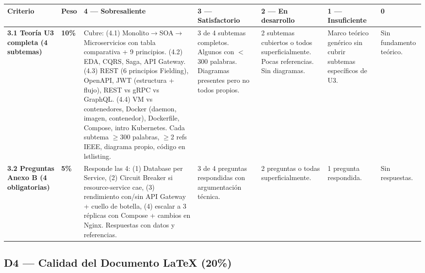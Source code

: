 \documentclass[11pt,a4paper,landscape]{article}
\begin{document}
	\begin{center}
		\footnotesize
		\begin{tabular}{|P{2.2cm}|C{1cm}|L{8.2cm}|L{3.8cm}|L{3.8cm}|L{3cm}|L{2cm}|}
			\hline
			\color{white}\textbf{Criterio} & \color{white}\textbf{Peso} &
			\color{white}\textbf{4 --- Sobresaliente} &
			\color{white}\textbf{3 --- Satisfactorio} &
			\color{white}\textbf{2 --- En desarrollo} &
			\color{white}\textbf{1 --- Insuficiente} &
			\color{white}\textbf{0}\\
			\hline
			
			\textbf{3.1 Teor\'ia U3 completa (4 subtemas)} &
			\textbf{10\%} &
			Cubre: (4.1) Monolito$\to$SOA$\to$Microservicios con tabla comparativa + 9 principios. (4.2) EDA, CQRS, Saga, API Gateway. (4.3) REST (6 principios Fielding), OpenAPI, JWT (estructura + flujo), REST vs gRPC vs GraphQL. (4.4) VM vs contenedores, Docker (daemon, imagen, contenedor), Dockerfile, Compose, intro Kubernetes. Cada subtema $\geq$300 palabras, $\geq$2 refs IEEE, diagrama propio, c\'odigo en lstlisting. &
			3 de 4 subtemas completos. Algunos con $<$300 palabras. Diagramas presentes pero no todos propios. &
			2 subtemas cubiertos o todos superficialmente. Pocas referencias. Sin diagramas. &
			Marco te\'orico gen\'erico sin cubrir subtemas espec\'ificos de U3. &
			Sin fundamento te\'orico.\\
			\hline
			
			\textbf{3.2 Preguntas Anexo B (4 obligatorias)} &
			\textbf{5\%} &
			Responde las 4: (1) Database per Service, (2) Circuit Breaker si resource-service cae, (3) rendimiento con/sin API Gateway + cuello de botella, (4) escalar a 3 r\'eplicas con Compose + cambios en Nginx. Respuestas con datos y referencias. &
			3 de 4 preguntas respondidas con argumentaci\'on t\'ecnica. &
			2 preguntas o todas superficialmente. &
			1 pregunta respondida. &
			Sin respuestas.\\
			\hline
		\end{tabular}
	\end{center}
	
	\newpage
	
	\subsection{D4 --- Calidad del Documento LaTeX (20\%)}
	
\end{document}
